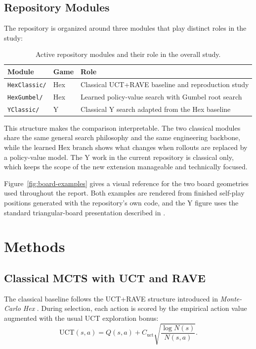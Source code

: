 \documentclass[11pt,a4paper]{article}
\begin{document}
\subsection{Repository Modules}

The repository is organized around three modules that play distinct roles in
the study:

\begin{table}[t]
\centering
\begin{tabular}{@{}lll@{}}
\toprule
Module & Game & Role \\
\midrule
\texttt{HexClassic/} & Hex & Classical UCT+RAVE baseline and reproduction study \\
\texttt{HexGumbel/} & Hex & Learned policy-value search with Gumbel root search \\
\texttt{YClassic/} & Y & Classical Y search adapted from the Hex baseline \\
\bottomrule
\end{tabular}
\caption{Active repository modules and their role in the overall study.}
\label{tab:repo-modules}
\end{table}

This structure makes the comparison interpretable. The two classical modules
share the same general search philosophy and the same engineering backbone,
while the learned Hex branch shows what changes when rollouts are replaced by a
policy-value model. The Y work in the current repository is classical only,
which keeps the scope of the new extension manageable and technically focused.

Figure~\ref{fig:board-examples} gives a visual reference for the two board
geometries used throughout the report. Both examples are rendered from finished
self-play positions generated with the repository's own code, and the Y figure
uses the standard triangular-board presentation described in
\cite{boardspace_y,gambiter_y}.

\section{Methods}

\subsection{Classical MCTS with UCT and RAVE}

The classical baseline follows the UCT+RAVE structure introduced in
\emph{Monte-Carlo Hex} \cite{cazenave2010montecarlohex}. During selection, each
action is scored by the empirical action value augmented with the usual UCT
exploration bonus:
\[
\mathrm{UCT}(s,a)=Q(s,a)+C_{\mathrm{uct}}
\sqrt{\frac{\log N(s)}{N(s,a)}}.
\]
\end{document}
